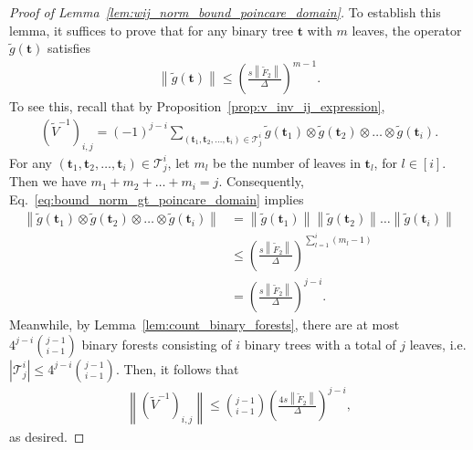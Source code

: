 \documentclass[superscriptaddress,onecolumn,nofootinbib,longbibliography,a4paper,accepted=2026-09-29]{quantumarticle}
\theoremstyle{plain}
\theoremstyle{definition}
\numberwithin{thm}{section}
\numberwithin{assumption}{section}
\numberwithin{lemma}{section}
\numberwithin{prop}{section}
\numberwithin{cor}{section}
\numberwithin{definition}{section}
\numberwithin{rmk}{section}
\numberwithin{equation}{section}
\newcommand{\norm}[1]     {\left\| #1 \right\|}
\newcommand{\lrb}[1]{\left ( #1 \right )}
\newcommand{\mbt}{\mathbf{t}}
\begin{document}
\begin{proof} [Proof of Lemma~\ref{lem:wij_norm_bound_poincare_domain}]
To establish this lemma, it suffices to prove that for any binary tree $\mbt$ with $m$ leaves, the operator $\tilde{g}(\mbt)$ satisfies
\begin{align}
\norm{\tilde{g}(\mbt)} \le \lrb{\frac{s\norm{\tilde{F}_2}}{\Delta}}^{m-1}.
\label{eq:bound_norm_gt_poincare_domain}
\end{align}
To see this, recall that by Proposition~\ref{prop:v_inv_ij_expression}, 
\begin{align}
    \lrb{\tilde{V}^{-1}}_{i,j} = (-1)^{j-i} \sum_{(\mbt_1,\mbt_2,\dots,\mbt_i) \in \mathcal{T}^i_j} \tilde{g}(\mbt_1) \otimes \tilde{g}(\mbt_2) \otimes \dots \otimes \tilde{g}(\mbt_i).   
\end{align}
For any $(\mbt_1,\mbt_2,\dots,\mbt_i) \in \mathcal{T}^i_j$, let $m_l$ be the number of leaves in $\mbt_l$, for $l \in [i]$. Then we have $m_1+m_2+\dots+m_i=j$. Consequently,  Eq.~\eqref{eq:bound_norm_gt_poincare_domain} implies
\begin{align}
\norm{\tilde{g}(\mbt_1) \otimes \tilde{g}(\mbt_2) \otimes \dots \otimes \tilde{g}(\mbt_i)} &=\norm{\tilde{g}(\mbt_1)}\norm{\tilde{g}(\mbt_2)} \dots \norm{\tilde{g}(\mbt_i)} \\
&\le \lrb{\frac{s\norm{\tilde{F}_2}}{\Delta}}^{\sum_{l=1}^i (m_l-1)} \\
&=\lrb{\frac{s\norm{\tilde{F}_2}}{\Delta}}^{j-i}.
\end{align}
Meanwhile, by Lemma~\ref{lem:count_binary_forests}, there are at most $4^{j-i}\binom{j-1}{i-1}$ binary forests consisting of $i$ binary trees with a total of $j$ leaves, i.e. $|\mathcal{T}^i_j|\le 4^{j-i}\binom{j-1}{i-1}$. Then, it follows that
\begin{align}
\norm{\lrb{\tilde{V}^{-1}}_{i,j}} \le \binom{j-1}{i-1}\lrb{\frac{4s\norm{\tilde{F}_2}}{\Delta}}^{j-i}, 
\end{align}    
as desired.


\end{proof}
\end{document}
